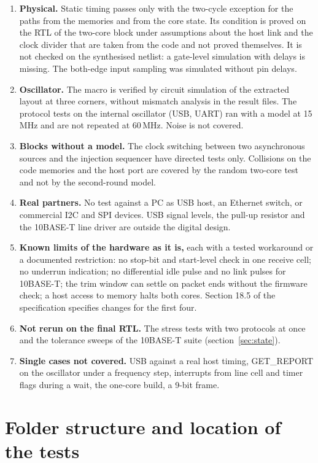 \documentclass[10pt,a4paper]{article}
\begin{document}
\begin{enumerate}
\item \textbf{Physical.} Static timing passes only with the two-cycle exception for the paths from the
memories and from the core state. Its condition is proved on the RTL of the two-core block under assumptions
about the host link and the clock divider that are taken from the code and not proved themselves. It is not
checked on the synthesised netlist: a gate-level simulation with delays is missing. The both-edge input
sampling was simulated without pin delays.
\item \textbf{Oscillator.} The macro is verified by circuit simulation of the extracted layout at three
corners, without mismatch analysis in the result files. The protocol tests on the internal oscillator (USB,
UART) ran with a model at 15\,MHz and are not repeated at 60\,MHz. Noise is not covered.
\item \textbf{Blocks without a model.} The clock switching between two asynchronous sources and the injection
sequencer have directed tests only. Collisions on the code memories and the host port are covered by the random
two-core test and not by the second-round model.
\item \textbf{Real partners.} No test against a PC as USB host, an Ethernet switch, or commercial I2C and SPI
devices. USB signal levels, the pull-up resistor and the 10BASE-T line driver are outside the digital design.
\item \textbf{Known limits of the hardware as it is,} each with a tested workaround or a documented restriction:
no stop-bit and start-level check in one receive cell; no underrun indication; no differential idle pulse and no
link pulses for 10BASE-T; the trim window can settle on packet ends without the firmware check; a host access
to memory halts both cores. Section 18.5 of the specification specifies changes for the first four.
\item \textbf{Not rerun on the final RTL.} The stress tests with two protocols at once and the tolerance sweeps
of the 10BASE-T suite (section~\ref{sec:state}).
\item \textbf{Single cases not covered.} USB against a real host timing, GET\_REPORT on the oscillator under a
frequency step, interrupts from line cell and timer flags during a wait, the one-core build, a 9-bit frame.
\end{enumerate}

\section{Folder structure and location of the tests}\label{sec:where}
\end{document}
